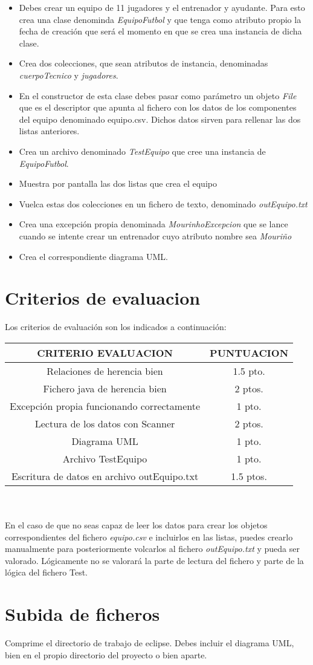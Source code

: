 \documentclass[4paper]{article}
\begin{document}
\begin{itemize}
\item Debes crear un equipo de 11 jugadores y el entrenador y ayudante. Para esto crea una clase denominda \emph{EquipoFutbol} y que tenga como atributo propio la fecha de creación que será el momento en que se crea una instancia de dicha clase.
\item Crea dos colecciones, que sean atributos de instancia, denominadas \emph{cuerpoTecnico} y \emph{jugadores}.
\item En el constructor de esta clase debes pasar como parámetro un objeto \emph{File} que es el descriptor que apunta al fichero con los datos de los componentes del equipo denominado equipo.csv. Dichos datos sirven para rellenar las dos listas anteriores.
\item Crea un archivo denominado \emph{TestEquipo} que cree una instancia de \emph{EquipoFutbol}.
\item Muestra por pantalla las dos listas que crea el equipo
\item Vuelca estas dos colecciones en un fichero de texto, denominado \emph{outEquipo.txt}
\item Crea una excepción propia denominada \emph{MourinhoExcepcion} que se lance cuando se intente crear un entrenador cuyo atributo nombre sea \emph{Mouriño}
\item Crea el correspondiente diagrama UML.
\end{itemize}

\section*{Criterios de evaluacion}
Los criterios de evaluación son los indicados a continuación:\par 
\vspace*{0.5cm}
\begin{tabular}{|c|c|}
\hline
\textbf{CRITERIO EVALUACION} & \textbf{PUNTUACION} \\
\hline
Relaciones de herencia bien & 1.5 pto.\\
\hline
Fichero java de herencia bien & 2 ptos. \\
\hline
Excepción propia funcionando correctamente & 1 pto.\\
\hline
Lectura de los datos con Scanner & 2 ptos.\\
\hline 
Diagrama UML & 1 pto.\\
\hline
Archivo TestEquipo & 1 pto.\\
\hline
Escritura de datos en archivo outEquipo.txt & 1.5 ptos.\\
\hline
\end{tabular}
\\
\\
En el caso de que no seas capaz de leer los datos para crear los objetos correspondientes del fichero \emph{equipo.csv} e incluirlos en las listas, puedes crearlo manualmente para posteriormente volcarlos al fichero \emph{outEquipo.txt} y pueda ser valorado. Lógicamente no se valorará la parte de lectura del fichero y parte de la lógica del fichero Test.
\section*{Subida de ficheros}
Comprime el directorio de trabajo de eclipse. Debes incluir el diagrama UML, bien en el propio directorio del proyecto o bien aparte. 
\end{document}

